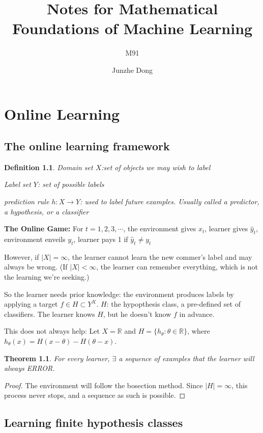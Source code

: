 \documentclass{book}
\title{Notes for Mathematical Foundations of Machine Learning}
\author{M91\and Junzhe Dong}
\newtheorem{Thm}{Theorem}[section]
\newtheorem{Def}{Definition}[section]
\begin{document}
\maketitle

\chapter{Online Learning}

\section{The online learning framework}
\begin{Def}
Domain set $X$:set of objects we may
wish to label

Label set $Y$: set of possible labels


prediction rule $h:X\to Y$: used to
label future examples. Usually called a
predictor, a hypothesis, or a classifier
\end{Def}

\textbf{The Online Game: } For $t=1,2,3,\cdots$, the environment gives $x_{t}$, learner gives $\hat y_{t}$, environment enveils $y_{t}$, learner pays 1 if $\hat y_{t}\neq y_{t}$

However, if $|X|=\infty$, the learner cannot learn the new commer's label and may always be wrong. (If $|X|<\infty$, the learner can remember everything, which is not the learning we're seeking.)

So the learner needs prior knowledge: the environment produces labels by applying a target $f\in H\subset Y^{X}$. $H$: the hypopthesis class, a pre-defined set of classifiers. The learner knows $H$, but he doesn't know $f$ in advance.

This does not always help: Let $X=\mathbb{R}$ and $H=\{h_{\theta}:\theta\in \mathbb{R}\}$, where $h_{\theta}(x)=H(x-\theta)-H(\theta-x)$.
\begin{Thm}
For every learner, $\exists$ a sequence of examples that the learner will always ERROR. 
\end{Thm}

\begin{proof}
  The environment will follow the bosection method. Since $|H|=\infty$, this process never stops, and a sequence as such is possible. 
\end{proof}

\section{Learning finite hypothesis classes}
\end{document}
